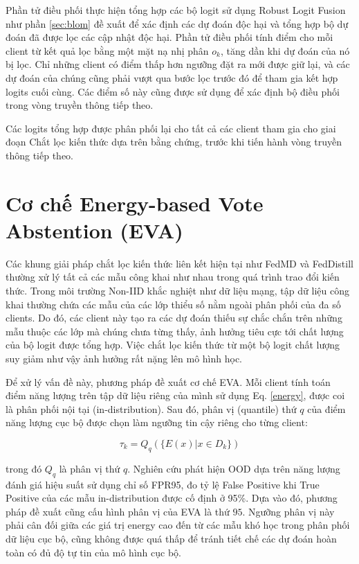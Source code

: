 Phần tử điều phối thực hiện tổng hợp các bộ logit sử dụng Robust Logit Fusion như phần \ref{sec:blom} đề xuất để xác định các dự đoán độc hại và tổng hợp bộ dự đoán đã được lọc các cập nhật độc hại. Phần tử điều phối tính điểm cho mỗi client từ kết quả lọc bằng một mặt nạ nhị phân $o_k$, tăng dần khi dự đoán của nó bị lọc. Chỉ những client có điểm thấp hơn ngưỡng đặt ra mới được giữ lại, và các dự đoán của chúng cũng phải vượt qua bước lọc trước đó để tham gia kết hợp logits cuối cùng. Các điểm số này cũng được sử dụng để xác định bộ điều phối trong vòng truyền thông tiếp theo.

Các logits tổng hợp được phân phối lại cho tất cả các client tham gia cho giai đoạn Chắt lọc kiến thức dựa trên bằng chứng, trước khi tiến hành vòng truyền thông tiếp theo.

\section{Cơ chế Energy-based Vote Abstention (EVA)}
\label{sec:eva}

Các khung giải pháp chắt lọc kiến thức liên kết hiện tại như FedMD \cite{li2019fedmd} và FedDistill \cite{roux2025byzantine} thường xử lý tất cả các mẫu công khai như nhau trong quá trình trao đổi kiến thức. Trong môi trường Non-IID khắc nghiệt như dữ liệu mạng, tập dữ liệu công khai thường chứa các mẫu của các lớp thiểu số nằm ngoài phân phối của đa số clients. Do đó, các client này tạo ra các dự đoán thiếu sự chắc chắn trên những mẫu thuộc các lớp mà chúng chưa từng thấy, ảnh hưởng tiêu cực tới chất lượng của bộ logit được tổng hợp. Việc chắt lọc kiến thức từ một bộ logit chất lượng suy giảm như vậy ảnh hưởng rất nặng lên mô hình học.

Để xử lý vấn đề này, phương pháp đề xuất cơ chế EVA. Mỗi client tính toán điểm năng lượng trên tập dữ liệu riêng của mình sử dụng Eq. \ref{energy}, được coi là phân phối nội tại (in-distribution). Sau đó, phân vị (quantile) thứ $q$ của điểm năng lượng cục bộ được chọn làm ngưỡng tin cậy riêng cho từng client:

\begin{equation}
\label{eva}
\tau_k=Q_q(\{E(x) | x \in D_k\})
\end{equation}

trong đó $Q_q$ là phân vị thứ $q$. Nghiên cứu phát hiện OOD dựa trên năng lượng \cite{liu2020energy} đánh giá hiệu suất sử dụng chỉ số FPR95, đo tỷ lệ False Positive khi True Positive của các mẫu in-distribution được cố định ở 95\%. Dựa vào đó, phương pháp đề xuất cũng cấu hình phân vị của EVA là thứ $95$. Ngưỡng phân vị này phải cân đối giữa các giá trị energy cao đến từ các mẫu khó học trong phân phối dữ liệu cục bộ, cũng không được quá thấp để tránh tiết chế các dự đoán hoàn toàn có đủ độ tự tin của mô hình cục bộ.

